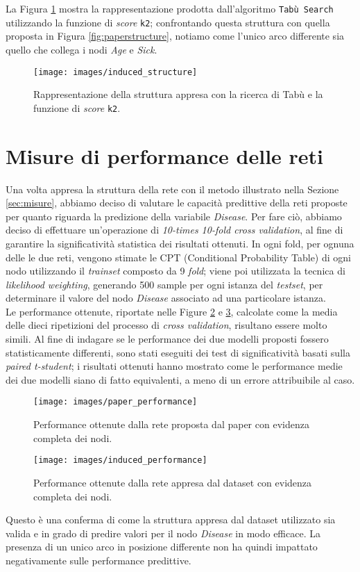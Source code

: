 La Figura \ref{fig:inducedstructure} mostra la rappresentazione prodotta dall'algoritmo \texttt{Tabù Search} utilizzando la funzione di \textit{score} \texttt{k2}; confrontando questa struttura con quella proposta in Figura \ref{fig:paperstructure}, notiamo come l'unico arco differente sia quello che collega i nodi \textit{Age} e \textit{Sick}.

\begin{figure}
	\centering
	\texttt{[image: images/induced\_structure]}
	\caption{Rappresentazione della struttura appresa con la ricerca di Tabù e la funzione di \textit{score} \texttt{k2}.}
	\label{fig:inducedstructure}
\end{figure}

\newpage
\section{Misure di performance delle reti}
\label{sec:performance}
Una volta appresa la struttura della rete con il metodo illustrato nella Sezione \ref{sec:misure}, abbiamo deciso di valutare le capacità predittive della reti proposte per quanto riguarda la predizione della variabile \textit{Disease}. Per fare ciò, abbiamo deciso di effettuare un'operazione di \textit{10-times 10-fold cross validation}, al fine di garantire la significatività statistica dei risultati ottenuti. In ogni fold, per ognuna delle le due reti, vengono stimate le CPT (Conditional Probability Table) di ogni nodo utilizzando il \textit{trainset} composto da 9 \textit{fold}; viene poi utilizzata la tecnica di \textit{likelihood weighting}, generando 500 sample per ogni istanza del \textit{testset}, per determinare il valore del nodo \textit{Disease} associato ad una particolare istanza.\\
Le performance ottenute, riportate nelle Figure \ref{fig:paperperformance} e \ref{fig:inducedperformance}, calcolate come la media delle dieci ripetizioni del processo di \textit{cross validation}, risultano essere molto simili. Al fine di indagare se le performance dei due modelli proposti fossero statisticamente differenti, sono stati eseguiti dei test di significatività basati sulla \textit{paired t-student}; i risultati ottenuti hanno mostrato come le performance medie dei due modelli siano di fatto equivalenti, a meno di un errore attribuibile al caso.
\begin{figure}
	\centering
	\texttt{[image: images/paper\_performance]}
	\caption{Performance ottenute dalla rete proposta dal paper con evidenza completa dei nodi.}
	\label{fig:paperperformance}
\end{figure}
\begin{figure}
	\centering
	\texttt{[image: images/induced\_performance]}
	\caption{Performance ottenute dalla rete appresa dal dataset con evidenza completa dei nodi.}
	\label{fig:inducedperformance}
\end{figure}
Questo è una conferma di come la struttura appresa dal dataset utilizzato sia valida e in grado di predire valori per il nodo \textit{Disease} in modo efficace. La presenza di un unico arco in posizione differente non ha quindi impattato negativamente sulle performance predittive.


